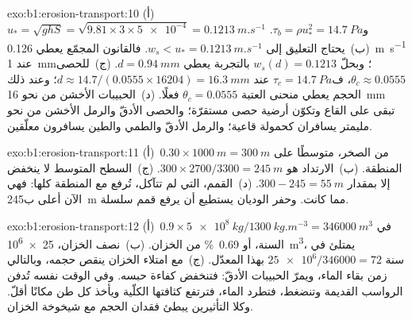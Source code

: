 \begin{solution}{exo:b1:erosion-transport:10}
(أ)~$u_* = \sqrt{g h S} = \sqrt{9.81 \times 3 \times \num{5e-4}} =
\qty{0.1213}{m.s^{-1}}$ و$\tau_b = \rho u_*^2 = \qty{14.7}{Pa}$.
(ب)~يحتاج التعليق إلى $w_s < u_* = \qty{0.1213}{m.s^{-1}}$. فالقانون المجمّع
يعطي \qty{0.126}{m.s^{-1}} عند \qty{1}{mm}؛ وبحلّ
$w_s(d) = 0.1213$ بالتجربة يعطي $d = \qty{0.94}{mm}$. (ج)~للحصى
$\theta_c \approx 0.0555$، ف$\tau_c = \qty{14.7}{Pa}$ عند $d \approx
14.7/(0.0555 \times 16204) = \qty{16.3}{mm}$؛ وعند ذلك الحجم يعطي منحنى العتبة
$\theta_c = 0.0555$ فعلًا. (د)~الحبيبات الأخشن من نحو \qty{16}{mm} تبقى على
القاع وتكوّن أرضية حصى مستقرّة؛ والحصى الأدقّ والرمل الأخشن من نحو مليمتر
يسافران كحمولة قاعية؛ والرمل الأدقّ والطمي والطين يسافرون معلّقين.
\end{solution}

\begin{solution}{exo:b1:erosion-transport:11}
(أ)~$0.30 \times \qty{1000}{m} = \qty{300}{m}$ من الصخر، متوسطًا على المنطقة. (ب)~الارتداد هو $300 \times 2700/3300 = \qty{245}{m}$. (ج)~السطح المتوسط لا ينخفض إلا بمقدار $300 - 245 = \qty{55}{m}$. (د)~القمم، التي لم تتآكل، تُرفع مع المنطقة كلها: فهي الآن أعلى ب\qty{245}{m} مما كانت. وحفر الوديان يستطيع أن يرفع قمم سلسلة.
\end{solution}

\begin{solution}{exo:b1:erosion-transport:12}
(أ)~$0.9 \times \qty{5e8}{kg}/\qty{1300}{kg.m^{-3}} = \qty{346000}{m^3}$ في السنة،
أو \qty{0.69}{\percent} من الخزان. (ب)~نصف الخزان، \qty{25e6}{m^3}، يمتلئ في $\num{25e6}/\num{346000} = \num{72}\text{ سنة}$ بهذا المعدّل. (ج)~مع امتلاء الخزان ينقص حجمه، وبالتالي زمن بقاء الماء، ويمرّ الحبيبات الأدقّ: فتنخفض كفاءة حبسه. وفي الوقت نفسه تُدفن الرواسب القديمة وتنضغط، فتطرد الماء، فترتفع كثافتها الكلّية ويأخذ كل طن مكانًا أقلّ. وكلا التأثيرين يبطئ فقدان الحجم مع شيخوخة الخزان.
\end{solution}

